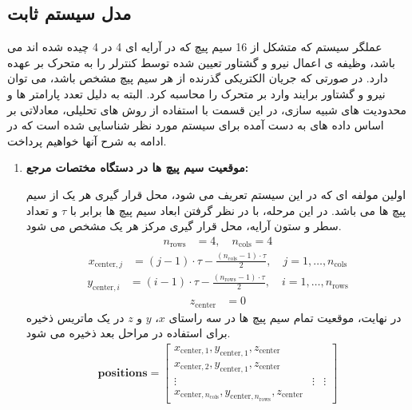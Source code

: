 \subsection{مدل سیستم ثابت}
عملگر سیستم که متشکل از 16 سیم پیچ که در آرایه ای 4 در 4 چیده شده اند می باشد، وظیفه ی اعمال نیرو و گشتاور تعیین شده توسط کنترلر را به متحرک بر عهده دارد. در صورتی که جریان الکتریکی گذرنده از هر سیم پیچ مشخص باشد، می توان نیرو و گشتاور برایند وارد بر متحرک را محاسبه کرد. البته به دلیل تعدد پارامتر ها و محدودیت های شبیه سازی، در این قسمت با استفاده از روش های تحلیلی، معادلاتی بر اساس داده های به دست آمده برای سیستم مورد نظر شناسایی شده است که در ادامه به شرح آنها خواهیم پرداخت.
\begin{enumerate}
	\item\textbf{ موقعیت سیم پیچ ها در دستگاه مختصات مرجع:}
	
	اولین مولفه ای که در این سیستم تعریف می شود، محل قرار گیری هر یک از سیم پیچ ها می باشد. در این مرحله، با در نظر گرفتن ابعاد سیم پیچ ها برابر با $\tau$ و تعداد سطر و ستون آرایه، محل قرار گیری مرکز هر یک مشخص می شود.  
	\begin{align}
		n_{\text{rows}} &= 4, \quad n_{\text{cols}} = 4
	\end{align}
	\begin{align}
		x_{\text{center}, j} &= (j - 1) \cdot \tau - \frac{(n_{\text{cols}} - 1) \cdot \tau}{2}, \quad j = 1, \dots, n_{\text{cols}}
	\end{align}
	\begin{align}
		y_{\text{center}, i} &= (i - 1) \cdot \tau - \frac{(n_{\text{rows}} - 1) \cdot \tau}{2}, \quad i = 1, \dots, n_{\text{rows}}
	\end{align}
	\begin{align}
		z_{\text{center}} &= 0
	\end{align}
	در نهایت، موقعیت تمام سیم پیچ ها در سه راستای $x$، $y$ و $z$ در یک ماتریس ذخیره برای استفاده در مراحل بعد ذخیره می شود.
	\begin{align}
		\mathbf{positions} =
		\begin{bmatrix}
			x_{\text{center}, 1}, y_{\text{center}, 1}, z_{\text{center}} \\
			x_{\text{center}, 2}, y_{\text{center}, 1}, z_{\text{center}} \\
			\vdots & \vdots & \vdots \\
			x_{\text{center}, n_{\text{cols}}}, y_{\text{center}, n_{\text{rows}}}, z_{\text{center}}
		\end{bmatrix}
	\end{align}
	

\end{enumerate}
